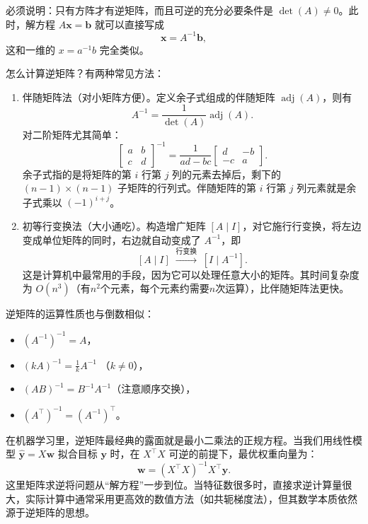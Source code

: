 必须说明：只有方阵才有逆矩阵，而且可逆的充分必要条件是 \(\det(A) \neq 0\)。此时，解方程 \(A\mathbf{x} = \mathbf{b}\) 就可以直接写成
\[
    \mathbf{x} = A^{-1} \mathbf{b},
\]
这和一维的 \(x = a^{-1}b\) 完全类似。

怎么计算逆矩阵？有两种常见方法：
\begin{enumerate}
    \item 伴随矩阵法（对小矩阵方便）。定义余子式组成的伴随矩阵 \(\operatorname{adj}(A)\)，则有
        \[
            A^{-1} = \frac{1}{\det(A)} \operatorname{adj}(A).
        \]
        对二阶矩阵尤其简单：
        \[
            \begin{bmatrix} a & b \\ c & d
            \end{bmatrix}^{-1} = \frac{1}{ad - bc}
            \begin{bmatrix} d & -b \\ -c & a
            \end{bmatrix}.
        \]
        余子式指的是将矩阵的第 \(i\) 行第 \(j\) 列的元素去掉后，剩下的 \((n-1) \times (n-1)\) 子矩阵的行列式。伴随矩阵的第 \(i\) 行第 \(j\) 列元素就是余子式乘以 \((-1)^{i+j}\)。
    \item 初等行变换法（大小通吃）。构造增广矩阵 \([A \mid I]\)，对它施行行变换，将左边变成单位矩阵的同时，右边就自动变成了 \(A^{-1}\)，即
        \[
            [A \mid I] \;\xrightarrow{\text{行变换}}\; [I \mid A^{-1}].
        \]
        这是计算机中最常用的手段，因为它可以处理任意大小的矩阵。其时间复杂度为 \(O(n^3)\)（有$n^2$个元素，每个元素约需要$n$次运算），比伴随矩阵法更快。
\end{enumerate}

逆矩阵的运算性质也与倒数相似：
\begin{itemize}
    \item \((A^{-1})^{-1} = A\)，
    \item \((kA)^{-1} = \frac{1}{k} A^{-1}\) （\(k \neq 0\)），
    \item \((AB)^{-1} = B^{-1} A^{-1}\)（注意顺序交换），
    \item \((A^\top)^{-1} = (A^{-1})^\top\)。
\end{itemize}

在机器学习里，逆矩阵最经典的露面就是最小二乘法的正规方程。当我们用线性模型 \(\hat{\mathbf{y}} = X \mathbf{w}\) 拟合目标 \(\mathbf{y}\) 时，在 \(X^\top X\) 可逆的前提下，最优权重向量为：
\[
    \mathbf{w} = (X^\top X)^{-1} X^\top \mathbf{y}.
\]
这里矩阵求逆将问题从“解方程”一步到位。当特征数很多时，直接求逆计算量很大，实际计算中通常采用更高效的数值方法（如共轭梯度法），但其数学本质依然源于逆矩阵的思想。

